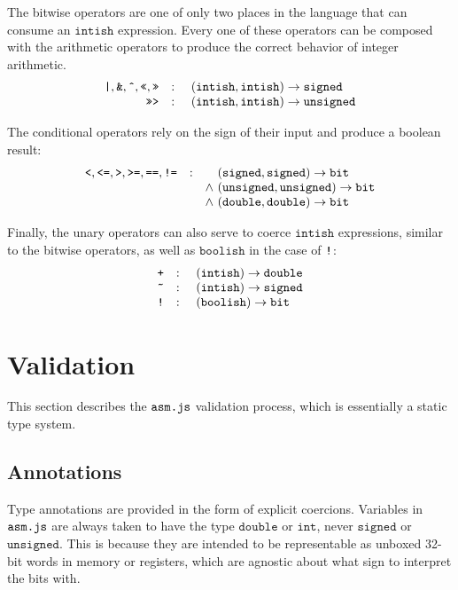\documentclass{article}
\newcommand{\funty}[2]{({#1}) \rightarrow {#2}}
\newcommand{\mathjs}[1]{\mbox{\texttt{{#1}}}}
\newcommand{\bit}{\mathtt{bit}}
\newcommand{\unsigned}{\mathtt{unsigned}}
\newcommand{\signed}{\mathtt{signed}}
\newcommand{\double}{\mathtt{double}}
\renewcommand{\int}{\mathtt{int}}
\newcommand{\boolish}{\mathtt{boolish}}
\newcommand{\intish}{\mathtt{intish}}
\begin{document}
The bitwise operators are one of only two places in the language that
can consume an $\intish$ expression. Every one of these operators can
be composed with the arithmetic operators to produce the correct
behavior of integer arithmetic.
\[
\begin{array}{rcc@{\ }l}
\mathjs{|}, \mathjs{\&}, \mathjs{\^{}}, \mathjs{<<}, \mathjs{>>}
                 & : &       & \funty{\intish, \intish}{\signed} \\
\mathjs{>>>}     & : &       & \funty{\intish, \intish}{\unsigned} \\
\end{array}
\]

The conditional operators rely on the sign of their input and produce
a boolean result:
\[
\begin{array}{rcc@{\ }l}
\mathjs{<}, \mathjs{<=}, \mathjs{>}, \mathjs{>=}, \mathjs{==}, \mathjs{!=}
                 & : &       & \funty{\signed, \signed}{\bit} \\
                 &   & \land & \funty{\unsigned, \unsigned}{\bit} \\
                 &   & \land & \funty{\double, \double}{\bit} \\
\end{array}
\]

Finally, the unary operators can also serve to coerce $\intish$
expressions, similar to the bitwise operators, as well as $\boolish$
in the case of $\mathjs{!}$:
\[
\begin{array}{rcc@{\ }l}
\mathjs{+}       & : &       & \funty{\intish}{\double} \\
\mathjs{\~{}}    & : &       & \funty{\intish}{\signed} \\
\mathjs{!}       & : &       & \funty{\boolish}{\bit} \\
\end{array}
\]

\section{Validation}

This section describes the $\mathjs{asm.js}$ validation process, which
is essentially a static type system.

\subsection{Annotations}

Type annotations are provided in the form of explicit
coercions. Variables in $\mathjs{asm.js}$ are always taken to have the
type $\double$ or $\int$, never $\signed$ or $\unsigned$. This is
because they are intended to be representable as unboxed 32-bit words
in memory or registers, which are agnostic about what sign to
interpret the bits with.
\end{document}
